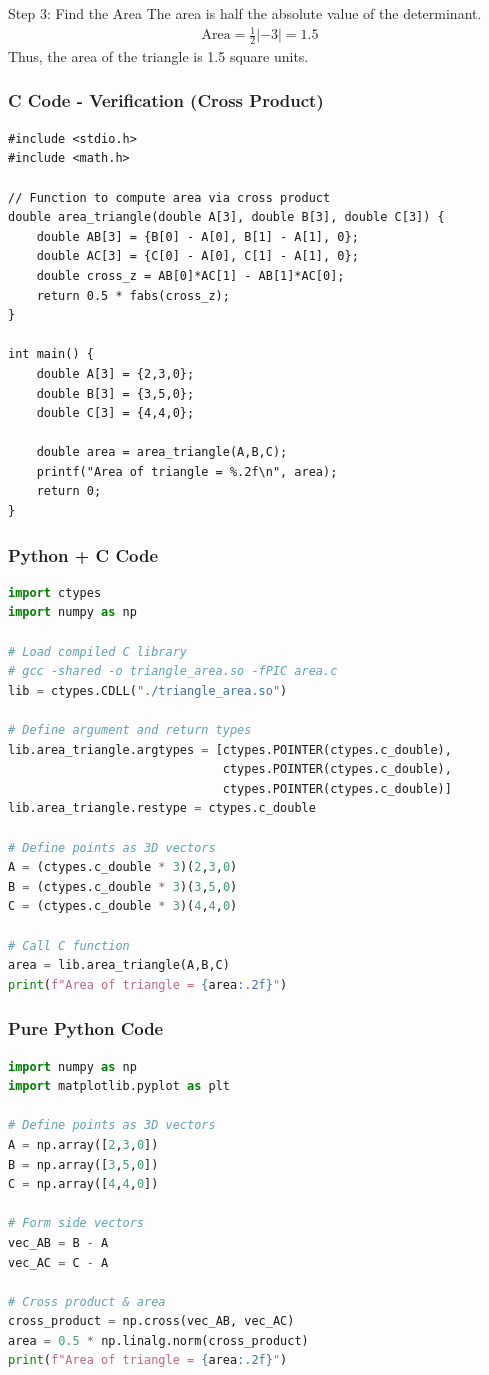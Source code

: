 \documentclass{beamer}
\begin{document}
\begin{frame}{Step 3: Find the Area}
The area is half the absolute value of the determinant.
\begin{align}
    \text{Area} = \frac{1}{2} |-3| = 1.5
\end{align}
Thus, the area of the triangle is 1.5 square units.
\end{frame}

\begin{frame}[fragile]
    \frametitle{C Code - Verification (Cross Product)}
    \begin{lstlisting}
#include <stdio.h>
#include <math.h>

// Function to compute area via cross product
double area_triangle(double A[3], double B[3], double C[3]) {
    double AB[3] = {B[0] - A[0], B[1] - A[1], 0};
    double AC[3] = {C[0] - A[0], C[1] - A[1], 0};
    double cross_z = AB[0]*AC[1] - AB[1]*AC[0];
    return 0.5 * fabs(cross_z);
}

int main() {
    double A[3] = {2,3,0};
    double B[3] = {3,5,0};
    double C[3] = {4,4,0};

    double area = area_triangle(A,B,C);
    printf("Area of triangle = %.2f\n", area);
    return 0;
}
    \end{lstlisting}
\end{frame}

\begin{frame}[fragile]
    \frametitle{Python + C Code}
    \begin{lstlisting}[language=Python]
import ctypes
import numpy as np

# Load compiled C library
# gcc -shared -o triangle_area.so -fPIC area.c
lib = ctypes.CDLL("./triangle_area.so")

# Define argument and return types
lib.area_triangle.argtypes = [ctypes.POINTER(ctypes.c_double),
                              ctypes.POINTER(ctypes.c_double),
                              ctypes.POINTER(ctypes.c_double)]
lib.area_triangle.restype = ctypes.c_double

# Define points as 3D vectors
A = (ctypes.c_double * 3)(2,3,0)
B = (ctypes.c_double * 3)(3,5,0)
C = (ctypes.c_double * 3)(4,4,0)

# Call C function
area = lib.area_triangle(A,B,C)
print(f"Area of triangle = {area:.2f}")
    \end{lstlisting}
\end{frame}

\begin{frame}[fragile]
    \frametitle{Pure Python Code}
    \begin{lstlisting}[language=Python]
import numpy as np
import matplotlib.pyplot as plt

# Define points as 3D vectors
A = np.array([2,3,0])
B = np.array([3,5,0])
C = np.array([4,4,0])

# Form side vectors
vec_AB = B - A
vec_AC = C - A

# Cross product & area
cross_product = np.cross(vec_AB, vec_AC)
area = 0.5 * np.linalg.norm(cross_product)
print(f"Area of triangle = {area:.2f}")
    \end{lstlisting}
\end{frame}
\end{document}
